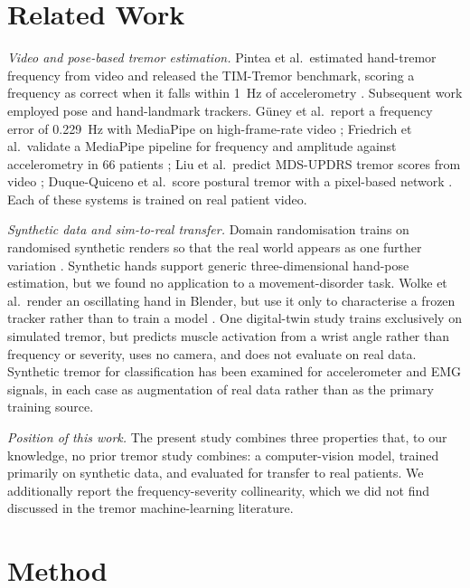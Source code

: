 \documentclass[conference]{IEEEtran}
\begin{document}
\section{Related Work}
\emph{Video and pose-based tremor estimation.} Pintea et al.\ estimated hand-tremor
frequency from video and released the TIM-Tremor benchmark, scoring a frequency as
correct when it falls within 1~Hz of accelerometry \cite{pintea2018}. Subsequent
work employed pose and hand-landmark trackers. G\"uney et al.\ report a frequency
error of 0.229~Hz with MediaPipe on high-frame-rate video \cite{guney2022};
Friedrich et al.\ validate a MediaPipe pipeline for frequency and amplitude against
accelerometry in 66 patients \cite{friedrich2024}; Liu et al.\ predict MDS-UPDRS
tremor scores from video \cite{liu2023}; Duque-Quiceno et al.\ score postural
tremor with a pixel-based network \cite{duque2024}. Each of these systems is
trained on real patient video.

\emph{Synthetic data and sim-to-real transfer.} Domain randomisation trains on
randomised synthetic renders so that the real world appears as one further
variation \cite{tobin2017}. Synthetic hands support generic three-dimensional
hand-pose estimation, but we found no application to a movement-disorder task.
Wolke et al.\ render an oscillating hand in Blender, but use it only to
characterise a frozen tracker rather than to train a model \cite{wolke2025}. One
digital-twin study trains exclusively on simulated tremor, but predicts muscle
activation from a wrist angle rather than frequency or severity, uses no camera,
and does not evaluate on real data. Synthetic tremor for classification has been
examined for accelerometer and EMG signals, in each case as augmentation of real
data rather than as the primary training source.

\emph{Position of this work.} The present study combines three properties that, to
our knowledge, no prior tremor study combines: a computer-vision model, trained
primarily on synthetic data, and evaluated for transfer to real patients. We
additionally report the frequency-severity collinearity, which we did not find
discussed in the tremor machine-learning literature.

\section{Method}
\end{document}
